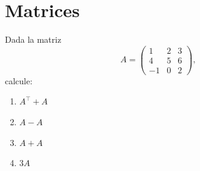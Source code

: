 \documentclass[a4,11pt]{aleph-notas}
\begin{document}
\encabezado

\section{Matrices}

\begin{ejer}
    Dada la matriz 
    \[
        A = \begin{pmatrix} 
            1 & 2 & 3 \\ 
            4 & 5 & 6 \\ 
            -1 & 0 & 2
            \end{pmatrix},
    \]
    calcule:
\begin{enumerate}
    \item $A^\intercal + A$
    \item $A - A$
    \item $A + A$
    \item $3A$
\end{enumerate}
\end{ejer}
\end{document}
